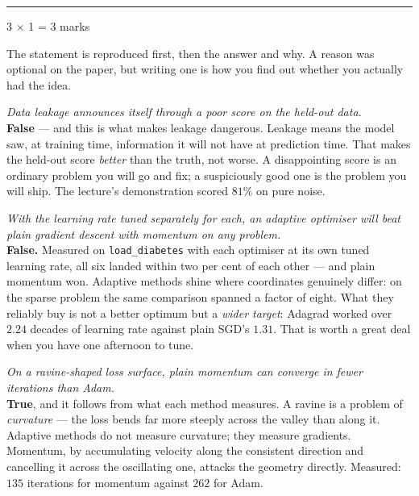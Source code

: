 \documentclass[10pt,a4paper]{article}
\newcommand{\parthead}[2]{\vspace{2pt}\noindent\rule{\linewidth}{0.4pt}\par\vspace{2pt}%
  \noindent{\bfseries Part #1}\hfill{\small #2}\par\vspace{1pt}}
\begin{document}
\newpage

\parthead{C --- True or false}{3 $\times$ 1 = 3 marks}

{\small The statement is reproduced first, then the answer and why. A reason was optional on the paper, but writing one is how you find out whether you actually had the idea.}

\begin{sC}

  \item \emph{Data leakage announces itself through a \emph{poor} score on the held-out data.}\\[2pt] \textbf{False} --- and this is what makes leakage dangerous. Leakage means the model saw, at training time, information it will not have at prediction time. That makes the held-out score \emph{better} than the truth, not worse. A disappointing score is an ordinary problem you will go and fix; a suspiciously good one is the problem you will ship. The lecture's demonstration scored $81\%$ on pure noise.

  \item \emph{With the learning rate tuned separately for each, an adaptive optimiser will beat plain gradient descent with momentum on any problem.}\\[2pt] \textbf{False.} Measured on \texttt{load\_diabetes} with each optimiser at its own tuned learning rate, all six landed within two per cent of each other --- and plain momentum won. Adaptive methods shine where coordinates genuinely differ: on the sparse problem the same comparison spanned a factor of eight. What they reliably buy is not a better optimum but a \emph{wider target}: Adagrad worked over $2.24$ decades of learning rate against plain SGD's $1.31$. That is worth a great deal when you have one afternoon to tune.

  \item \emph{On a ravine-shaped loss surface, plain momentum can converge in fewer iterations than Adam.}\\[2pt] \textbf{True}, and it follows from what each method measures. A ravine is a problem of \emph{curvature} --- the loss bends far more steeply across the valley than along it. Adaptive methods do not measure curvature; they measure gradients. Momentum, by accumulating velocity along the consistent direction and cancelling it across the oscillating one, attacks the geometry directly. Measured: $135$ iterations for momentum against $262$ for Adam.

\end{sC}
\end{document}
